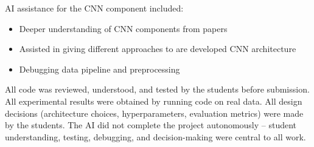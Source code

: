 \documentclass[letterpaper]{article} %
\begin{document}
AI assistance for the CNN component included:
\begin{itemize}
\item Deeper understanding of CNN components from papers
\item Assisted in giving different approaches to are developed CNN architecture
\item Debugging data pipeline and preprocessing
\end{itemize}

All code was reviewed, understood, and tested by the students before submission. All experimental results were obtained by running code on real data. All design decisions (architecture choices, hyperparameters, evaluation metrics) were made by the students. The AI did not complete the project autonomously -- student understanding, testing, debugging, and decision-making were central to all work.



\end{document}

